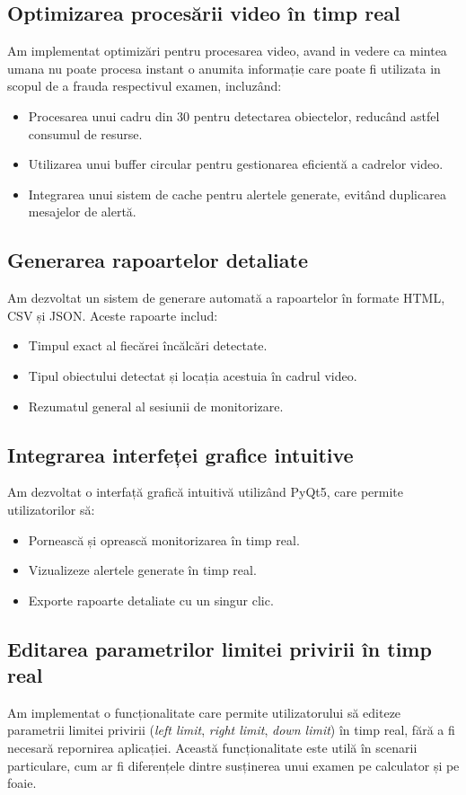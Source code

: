 \documentclass[12pt,a4paper]{article}
\begin{document}
\subsection{Optimizarea procesării video în timp real}
Am implementat optimizări pentru procesarea video, avand in vedere ca mintea umana nu poate procesa instant o anumita informație care poate fi utilizata in scopul de a frauda respectivul examen, incluzând:
\begin{itemize}
    \item Procesarea unui cadru din 30 pentru detectarea obiectelor, reducând astfel consumul de resurse.
    \item Utilizarea unui buffer circular pentru gestionarea eficientă a cadrelor video.
    \item Integrarea unui sistem de cache pentru alertele generate, evitând duplicarea mesajelor de alertă.
\end{itemize}

\subsection{Generarea rapoartelor detaliate}
Am dezvoltat un sistem de generare automată a rapoartelor în formate HTML, CSV și JSON. Aceste rapoarte includ:
\begin{itemize}
    \item Timpul exact al fiecărei încălcări detectate.
    \item Tipul obiectului detectat și locația acestuia în cadrul video.
    \item Rezumatul general al sesiunii de monitorizare.
\end{itemize}

\subsection{Integrarea interfeței grafice intuitive}
Am dezvoltat o interfață grafică intuitivă utilizând PyQt5, care permite utilizatorilor să:
\begin{itemize}
    \item Pornească și oprească monitorizarea în timp real.
    \item Vizualizeze alertele generate în timp real.
    \item Exporte rapoarte detaliate cu un singur clic.
\end{itemize}

\subsection{Editarea parametrilor limitei privirii în timp real}
Am implementat o funcționalitate care permite utilizatorului să editeze parametrii limitei privirii (\textit{left limit}, \textit{right limit}, \textit{down limit}) în timp real, fără a fi necesară repornirea aplicației. Această funcționalitate este utilă în scenarii particulare, cum ar fi diferențele dintre susținerea unui examen pe calculator și pe foaie. 
\end{document}

